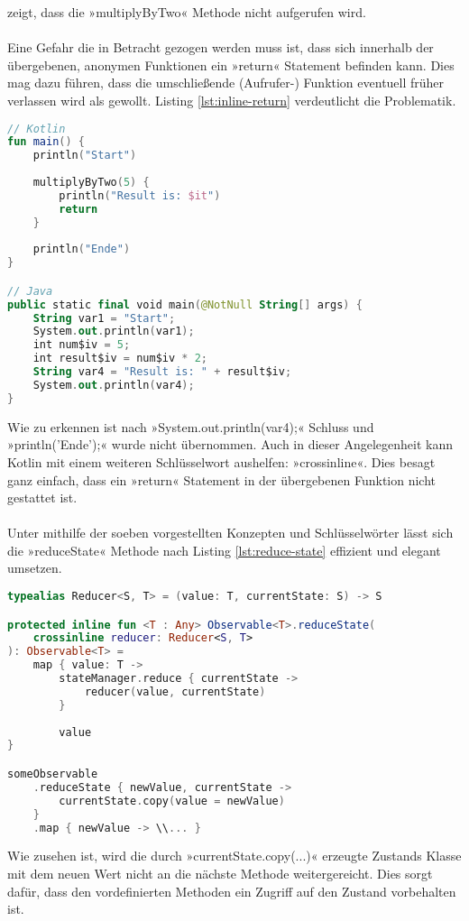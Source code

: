 zeigt, dass die »multiplyByTwo« Methode nicht aufgerufen wird.
\\\\
Eine Gefahr die in Betracht gezogen werden muss ist, dass sich innerhalb der übergebenen, anonymen Funktionen ein »return« Statement befinden kann. Dies mag dazu führen, dass die umschließende (Aufrufer-) Funktion eventuell früher verlassen wird als gewollt. Listing
\ref{lst:inline-return}
verdeutlicht die Problematik.
\begin{lstlisting}[caption={inline mit »return«}, label={lst:inline-compiled},language=Kotlin]
// Kotlin
fun main() {
	println("Start")
	
	multiplyByTwo(5) {
		println("Result is: $it")
		return
	}
	
	println("Ende")
}

// Java
public static final void main(@NotNull String[] args) {
	String var1 = "Start";
	System.out.println(var1);
	int num$iv = 5;
	int result$iv = num$iv * 2;
	String var4 = "Result is: " + result$iv;
	System.out.println(var4);
}
\end{lstlisting}
\bigskip
Wie zu erkennen ist nach »System.out.println(var4);« Schluss und »println('Ende');« wurde nicht übernommen. Auch in dieser Angelegenheit kann Kotlin mit einem weiteren Schlüsselwort aushelfen: »crossinline«. Dies besagt ganz einfach, dass ein »return« Statement in der übergebenen Funktion nicht gestattet ist.
\\\\
Unter mithilfe der soeben vorgestellten Konzepten und Schlüsselwörter lässt sich die »reduceState« Methode nach Listing
\ref{lst:reduce-state}
effizient und elegant umsetzen.
\begin{lstlisting}[caption={»reduceState« Methode}, label={lst:reduce-state},language=Kotlin]
typealias Reducer<S, T> = (value: T, currentState: S) -> S

protected inline fun <T : Any> Observable<T>.reduceState(
	crossinline reducer: Reducer<S, T>
): Observable<T> =
	map { value: T ->
		stateManager.reduce { currentState ->
			reducer(value, currentState)
		}
	
		value
}

someObservable
	.reduceState { newValue, currentState ->
		currentState.copy(value = newValue)
	}
	.map { newValue -> \\... }
\end{lstlisting}
\bigskip
Wie zusehen ist, wird die durch »currentState.copy(...)« erzeugte Zustands Klasse mit dem neuen Wert nicht an die nächste Methode weitergereicht. Dies sorgt dafür, dass den vordefinierten Methoden ein Zugriff auf den Zustand vorbehalten ist.
